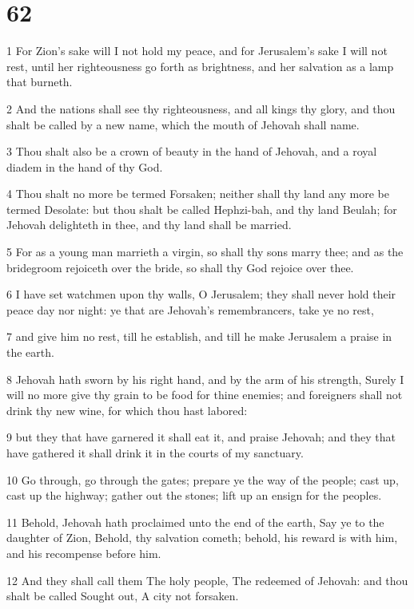 \chapter{62}

\par 1 For Zion's sake will I not hold my peace, and for Jerusalem's sake I will not rest, until her righteousness go forth as brightness, and her salvation as a lamp that burneth.
\par 2 And the nations shall see thy righteousness, and all kings thy glory, and thou shalt be called by a new name, which the mouth of Jehovah shall name.
\par 3 Thou shalt also be a crown of beauty in the hand of Jehovah, and a royal diadem in the hand of thy God.
\par 4 Thou shalt no more be termed Forsaken; neither shall thy land any more be termed Desolate: but thou shalt be called Hephzi-bah, and thy land Beulah; for Jehovah delighteth in thee, and thy land shall be married.
\par 5 For as a young man marrieth a virgin, so shall thy sons marry thee; and as the bridegroom rejoiceth over the bride, so shall thy God rejoice over thee.
\par 6 I have set watchmen upon thy walls, O Jerusalem; they shall never hold their peace day nor night: ye that are Jehovah's remembrancers, take ye no rest,
\par 7 and give him no rest, till he establish, and till he make Jerusalem a praise in the earth.
\par 8 Jehovah hath sworn by his right hand, and by the arm of his strength, Surely I will no more give thy grain to be food for thine enemies; and foreigners shall not drink thy new wine, for which thou hast labored:
\par 9 but they that have garnered it shall eat it, and praise Jehovah; and they that have gathered it shall drink it in the courts of my sanctuary.
\par 10 Go through, go through the gates; prepare ye the way of the people; cast up, cast up the highway; gather out the stones; lift up an ensign for the peoples.
\par 11 Behold, Jehovah hath proclaimed unto the end of the earth, Say ye to the daughter of Zion, Behold, thy salvation cometh; behold, his reward is with him, and his recompense before him.
\par 12 And they shall call them The holy people, The redeemed of Jehovah: and thou shalt be called Sought out, A city not forsaken.

